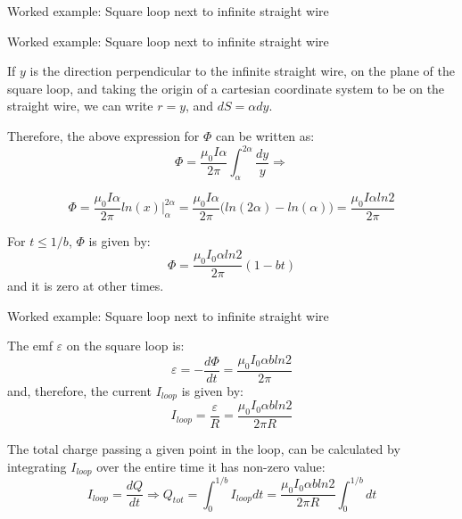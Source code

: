 {\begin{frame}{Worked example: Square loop next to infinite straight wire}
\end{frame}

%
%
%

\begin{frame}{Worked example: Square loop next to infinite straight wire}

  If $y$ is the direction perpendicular to the infinite straight wire, on
  the plane of the square loop, and taking the origin of a cartesian
  coordinate system to be on the straight wire, we can write $r=y$,
  and $dS = \alpha dy$.\\

  \vspace{0.2cm}

  Therefore, the above expression for $\Phi$ can be written as:
  \begin{equation*}
    \Phi = \frac{\mu_0 I \alpha}{2\pi} \int_{\alpha}^{2\alpha} \frac{dy}{y} \Rightarrow
  \end{equation*}

  \begin{equation*}
    \Phi = \frac{\mu_0 I \alpha}{2\pi} ln(x)\Big\rvert_{\alpha}^{2\alpha}
         = \frac{\mu_0 I \alpha}{2\pi} \Big(ln(2\alpha) - ln(\alpha)\Big)
         = \frac{\mu_0 I \alpha ln2}{2\pi}
  \end{equation*}

  For $t \le 1/b$, $\Phi$ is given by:
  \begin{equation*}
    \Phi = \frac{\mu_0 I_0 \alpha ln2}{2\pi} (1-bt)
  \end{equation*}
  and it is zero at other times.

\end{frame}

%
%
%

\begin{frame}{Worked example: Square loop next to infinite straight wire}

  The emf $\varepsilon$ on the square loop is:
  \begin{equation*}
    \varepsilon = -\frac{d\Phi}{dt} = \frac{\mu_0 I_0 \alpha b ln2}{2\pi}
  \end{equation*}
  and, therefore, the current $I_{loop}$ is given by:
  \begin{equation*}
    I_{loop} = \frac{\varepsilon}{R} = \frac{\mu_0 I_0 \alpha b ln2}{2\pi R}
  \end{equation*}

  The total charge passing a given point in the loop, can be calculated
  by integrating $I_{loop}$ over the entire time it has non-zero value:
  \begin{equation*}
    I_{loop} = \frac{dQ}{dt} \Rightarrow
     Q_{tot} = \int_{0}^{1/b} I_{loop} dt
             = \frac{\mu_0 I_0 \alpha b ln2}{2\pi R} \int_{0}^{1/b} dt
  \end{equation*}


\end{frame}}
